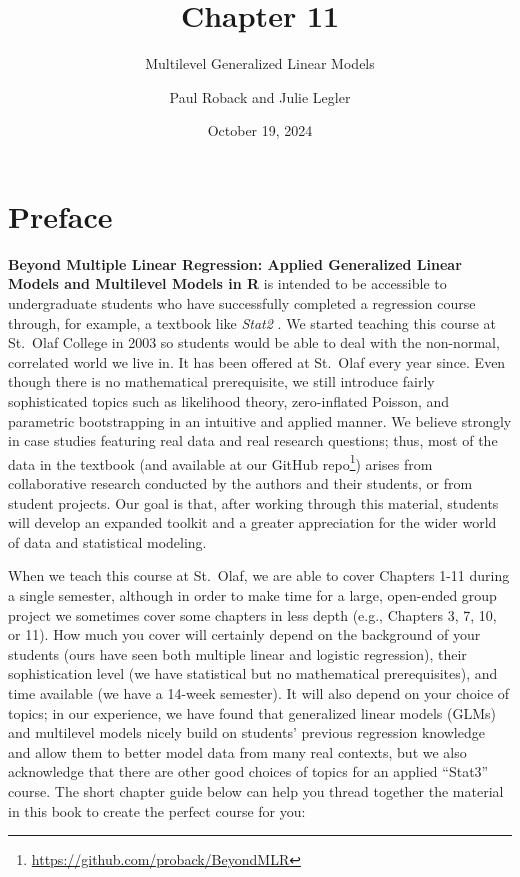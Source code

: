 \documentclass[
]{krantz}
\title{Chapter 11}
\subtitle{Multilevel Generalized Linear Models}
\author{Paul Roback and Julie Legler}
\date{October 19, 2024}
\renewcommand{\href}[2]{#2\footnote{\url{#1}}}
\begin{document}
\maketitle


\thispagestyle{empty}

\setlength{\abovedisplayskip}{-5pt}
\setlength{\abovedisplayshortskip}{-5pt}

{
\hypersetup{linkcolor=}
\setcounter{tocdepth}{2}
\tableofcontents
}
\chapter*{Preface}\label{preface}


\textbf{Beyond Multiple Linear Regression: Applied Generalized Linear Models and Multilevel Models in R} \citep{RProject} is intended to be accessible to undergraduate students who have successfully completed a regression course through, for example, a textbook like \emph{Stat2} \citep{Cannon2019}. We started teaching this course at St.~Olaf College in 2003 so students would be able to deal with the non-normal, correlated world we live in. It has been offered at St.~Olaf every year since. Even though there is no mathematical prerequisite, we still introduce fairly sophisticated topics such as likelihood theory, zero-inflated Poisson, and parametric bootstrapping in an intuitive and applied manner. We believe strongly in case studies featuring real data and real research questions; thus, most of the data in the textbook (and \href{https://github.com/proback/BeyondMLR}{available at our GitHub repo}) arises from collaborative research conducted by the authors and their students, or from student projects. Our goal is that, after working through this material, students will develop an expanded toolkit and a greater appreciation for the wider world of data and statistical modeling.

When we teach this course at St.~Olaf, we are able to cover Chapters 1-11 during a single semester, although in order to make time for a large, open-ended group project we sometimes cover some chapters in less depth (e.g., Chapters 3, 7, 10, or 11). How much you cover will certainly depend on the background of your students (ours have seen both multiple linear and logistic regression), their sophistication level (we have statistical but no mathematical prerequisites), and time available (we have a 14-week semester). It will also depend on your choice of topics; in our experience, we have found that generalized linear models (GLMs) and multilevel models nicely build on students' previous regression knowledge and allow them to better model data from many real contexts, but we also acknowledge that there are other good choices of topics for an applied ``Stat3'' course. The short chapter guide below can help you thread together the material in this book to create the perfect course for you:
\end{document}
